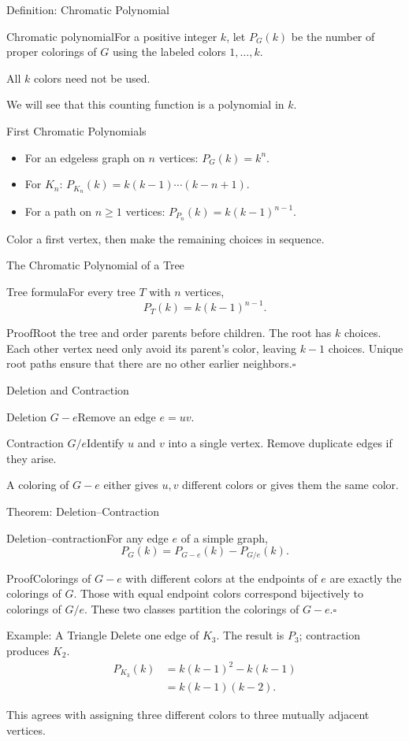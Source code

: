 \documentclass[aspectratio=169,11pt]{beamer}
\newcommand{\Def}[2]{\begin{block}{#1}#2\end{block}}
\newcommand{\Thm}[2]{\begin{block}{#1}#2\end{block}}
\renewcommand{\Proof}[1]{\begin{block}{Proof}\normalsize #1\end{block}}
\newcommand{\gap}{\par\medskip}
\begin{document}
\begin{frame}{Definition: Chromatic Polynomial}
\large
\Def{Chromatic polynomial}{For a positive integer $k$, let $P_G(k)$ be the number of proper colorings of $G$ using the labeled colors $1,\ldots,k$.}
\gap All $k$ colors need not be used.
\gap We will see that this counting function is a polynomial in $k$.
\end{frame}
\begin{frame}{First Chromatic Polynomials}
\large
\begin{itemize}\setlength{\itemsep}{.25cm}
\item For an edgeless graph on $n$ vertices: $P_G(k)=k^n$.
\item For $K_n$: $P_{K_n}(k)=k(k-1)\cdots(k-n+1)$.
\item For a path on $n\ge1$ vertices: $P_{P_n}(k)=k(k-1)^{n-1}$.
\end{itemize}
\gap Color a first vertex, then make the remaining choices in sequence.
\end{frame}
\begin{frame}{The Chromatic Polynomial of a Tree}
\large
\Thm{Tree formula}{For every tree $T$ with $n$ vertices,\[P_T(k)=k(k-1)^{n-1}.\]}
\Proof{Root the tree and order parents before children. The root has $k$ choices. Each other vertex need only avoid its parent's color, leaving $k-1$ choices. Unique root paths ensure that there are no other earlier neighbors.\hfill$\square$}
\end{frame}
\begin{frame}{Deletion and Contraction}
\large
\Def{Deletion $G-e$}{Remove an edge $e=uv$.}
\Def{Contraction $G/e$}{Identify $u$ and $v$ into a single vertex. Remove duplicate edges if they arise.}
\gap A coloring of $G-e$ either gives $u,v$ different colors or gives them the same color.
\end{frame}
\begin{frame}{Theorem: Deletion--Contraction}
\large
\Thm{Deletion--contraction}{For any edge $e$ of a simple graph,\[P_G(k)=P_{G-e}(k)-P_{G/e}(k).\]}
\Proof{Colorings of $G-e$ with different colors at the endpoints of $e$ are exactly the colorings of $G$. Those with equal endpoint colors correspond bijectively to colorings of $G/e$. These two classes partition the colorings of $G-e$.\hfill$\square$}
\end{frame}
\begin{frame}{Example: A Triangle}
\large
Delete one edge of $K_3$. The result is $P_3$; contraction produces $K_2$.
\begin{align*}P_{K_3}(k)&=k(k-1)^2-k(k-1)\\&=k(k-1)(k-2).\end{align*}
\gap This agrees with assigning three different colors to three mutually adjacent vertices.
\end{frame}
\end{document}
